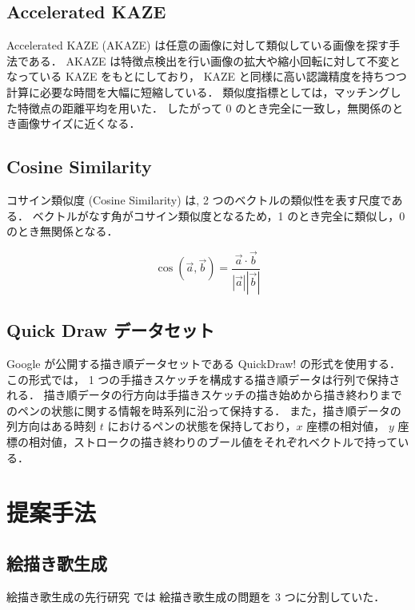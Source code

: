 \documentclass[twocolumn]{jarticle}     %
\begin{document}
  \subsection{Accelerated KAZE}
  Accelerated KAZE (AKAZE) \cite{alcantarilla2011fast} は任意の画像に対して類似している画像を探す手法である．
  AKAZE は特徴点検出を行い画像の拡大や縮小回転に対して不変となっている KAZE をもとにしており，
  KAZE と同様に高い認識精度を持ちつつ計算に必要な時間を大幅に短縮している．
  類似度指標としては，マッチングした特徴点の距離平均を用いた．
  したがって 0 のとき完全に一致し，無関係のとき画像サイズに近くなる．

    \subsection{Cosine Similarity}
    コサイン類似度 (Cosine Similarity) は, 2 つのベクトルの類似性を表す尺度である．
    ベクトルがなす角がコサイン類似度となるため，1 のとき完全に類似し，0 のとき無関係となる．

    \begin{equation}
      \cos( \overrightarrow{a}, \overrightarrow{b} ) =
      \frac{\overrightarrow{a} \cdot \overrightarrow{b}}{|\overrightarrow{a}| |\overrightarrow{b}|}
    \end{equation}


	\subsection{Quick Draw データセット}
	Google が公開する描き順データセットである QuickDraw! \cite{Cheema:2012:QID:2207676.2208550} の形式を使用する．
	この形式では， 1 つの手描きスケッチを構成する描き順データは行列で保持される．
	描き順データの行方向は手描きスケッチの描き始めから描き終わりまでのペンの状態に関する情報を時系列に沿って保持する．
	また，描き順データの列方向はある時刻 $t$ におけるペンの状態を保持しており，$x$ 座標の相対値， $y$ 座標の相対値，ストロークの描き終わりのブール値をそれぞれベクトルで持っている．


\section{提案手法}

\subsection{絵描き歌生成}
絵描き歌生成の先行研究 \cite{fujii} では
絵描き歌生成の問題を 3 つに分割していた．
\end{document}
